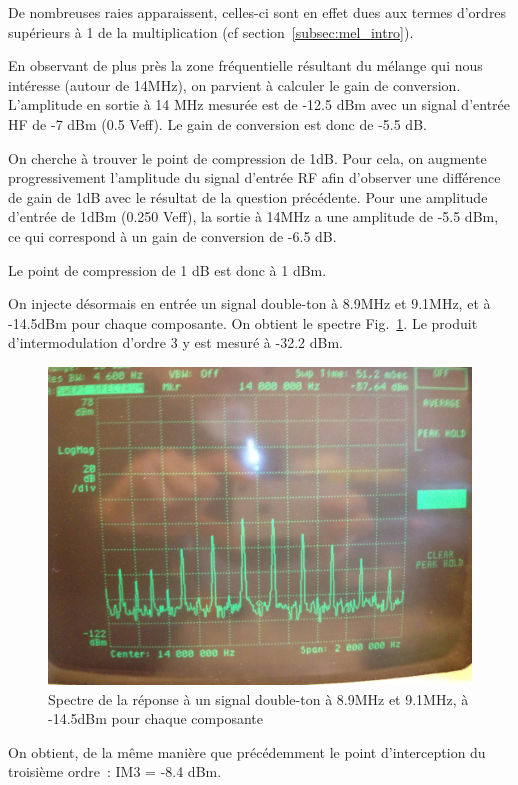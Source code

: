 \documentclass{article}
\begin{document}
De nombreuses raies apparaissent, celles-ci sont en effet dues aux termes d'ordres supérieurs à 1 de la multiplication (cf section~\ref{subsec:mel_intro}).



En observant de plus près la zone fréquentielle résultant du mélange qui nous intéresse (autour de 14MHz), on parvient à calculer le gain de conversion.
L'amplitude en sortie à 14 MHz mesurée est de -12.5 dBm avec un signal d'entrée HF de -7 dBm (0.5 Veff).
Le gain de conversion est donc de -5.5 dB.



On cherche à trouver le point de compression de 1dB. Pour cela, on augmente progressivement l'amplitude du signal d'entrée RF afin d'observer une différence de gain de 1dB avec le résultat de la question précédente.
Pour une amplitude d'entrée de 1dBm (0.250 Veff), la sortie à 14MHz a une amplitude de -5.5 dBm, ce qui correspond à un gain de conversion de -6.5 dB.

Le point de compression de 1 dB est donc à 1 dBm.


On injecte désormais en entrée un signal double-ton à 8.9MHz et 9.1MHz, et à -14.5dBm pour chaque composante.
On obtient le spectre Fig.~\ref{fig:9_3_4}. Le produit d'intermodulation d'ordre 3 y est mesuré à -32.2 dBm.

\begin{figure}[h!]
	\centering
	\includegraphics[width=.7\textwidth]{9_3_4}
	\caption{Spectre de la réponse à un signal double-ton à 8.9MHz et 9.1MHz, à -14.5dBm pour chaque composante}
	\label{fig:9_3_4}
\end{figure}


On obtient, de la même manière que précédemment le point d'interception du troisième ordre~: IM3 = -8.4 dBm.
\end{document}
